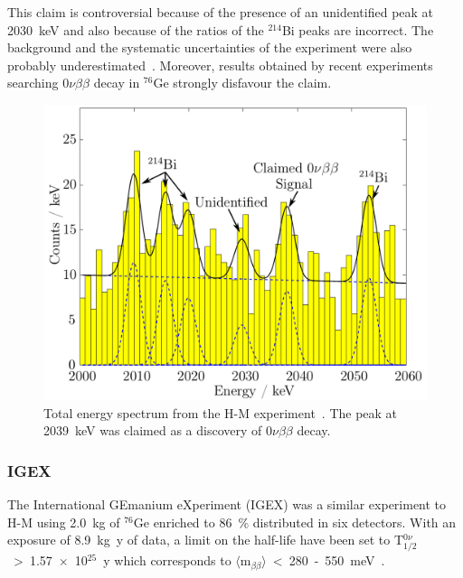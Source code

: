 \documentclass[main.tex]{subfiles}
\begin{document}
\bigskip


\NI This claim is controversial because of the presence of an unidentified peak at 2030~keV and also because of the ratios of the $^{\text{214}}$Bi peaks are incorrect. The background and the systematic uncertainties of the experiment were also probably underestimated~\cite{HeidelbergMoscow3}. Moreover, results obtained by recent experiments searching 0$\nu\beta\beta$ decay in $^{\text{76}}$Ge strongly disfavour the claim.



\begin{figure}[h!]
\begin{center}
\includegraphics[scale=0.3]{pictures/Chap2/H-M-experiment-claim.png}
\caption{Total energy spectrum from the H-M experiment~\cite{HeidelbergMoscow1}. The peak at 2039~keV was claimed as a discovery of 0$\nu\beta\beta$ decay.}
\label{HMexperimentClaim}
\end{center}
\end{figure}


\FloatBarrier

\subsubsection{IGEX}


\NI The International GEmanium eXperiment (IGEX) was a similar experiment to H-M using 2.0~kg of $^{\text{76}}$Ge enriched to 86~\% distributed in six detectors. With an exposure of 8.9~kg~y of data, a limit on the half-life have been set to T$_{\text{1/2}}^{0\nu}$~>~1.57~$\times$~10$^{\text{25}}$~y which corresponds to $\langle \text{m}_{\beta\beta} \rangle$~<~280~-~550~meV~\cite{IGEX}.
\end{document}
